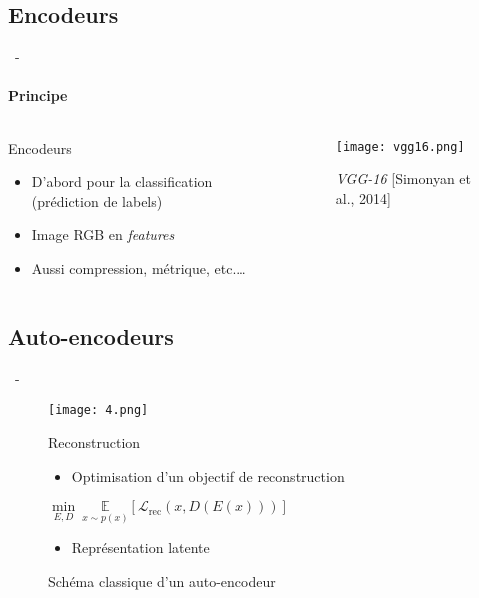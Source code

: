 \documentclass[aspectratio=169, 22pt]{beamer}
\begin{document}
\subsection{Encodeurs}
\begin{frame}{\secname~- \subsecname}
  \framesubtitle{Principe}
  \begin{columns}
    \begin{column}{0.4\linewidth}
      \begin{block}{Encodeurs}
        \begin{itemize}
        \item D'abord pour la classification (prédiction de labels)
        \item Image RGB en \alert{\emph{features}}
        \item Aussi compression, métrique, etc.…
        \end{itemize}
      \end{block}
    \end{column}
    \begin{column}{0.6\linewidth}
      \begin{figure}
        \centering
        \texttt{[image: vgg16.png]}
        \caption{\emph{VGG-16} [Simonyan et al., 2014]}
      \end{figure}
    \end{column}
  \end{columns}
\end{frame}

\subsection{Auto-encodeurs}
\begin{frame}{\secname~- \subsecname}
  \begin{figure}
    \centering
    \texttt{[image: 4.png]}
    \caption{Schéma classique d'un auto-encodeur}
    \begin{block}{Reconstruction}
      \centering
      \begin{itemize}
      \item Optimisation d'un objectif de reconstruction
      \end{itemize}
      $\underset{E,D}{\min}\ \underset{x \sim p(x)}{\mathbb{E}}\left[\mathcal{L}_{\text{rec}}(x,D(E(x)))\right]$
      \begin{itemize}        
      \item Représentation \alert{latente}
      \end{itemize}

    \end{block}
  \end{figure}
  
\end{frame}
\end{document}
